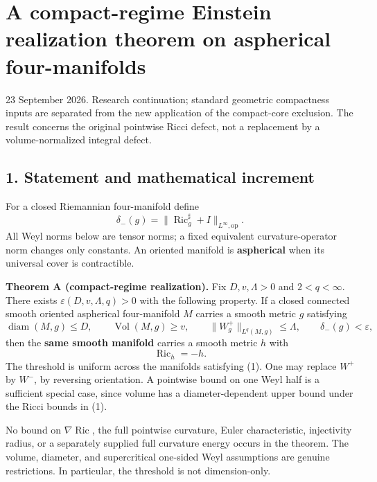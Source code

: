 \documentclass[
  11pt,
]{article}
\author{}
\date{23 September 2026}
\begin{document}
\hypertarget{a-compact-regime-einstein-realization-theorem-on-aspherical-four-manifolds}{%
\section{A compact-regime Einstein realization theorem on aspherical
four-manifolds}\label{a-compact-regime-einstein-realization-theorem-on-aspherical-four-manifolds}}

23 September 2026. Research continuation; standard geometric compactness
inputs are separated from the new application of the compact-core
exclusion. The result concerns the original pointwise Ricci defect, not
a replacement by a volume-normalized integral defect.

\hypertarget{statement-and-mathematical-increment}{%
\subsection{1. Statement and mathematical
increment}\label{statement-and-mathematical-increment}}

For a closed Riemannian four-manifold define \[
 \delta_-(g)=\|\operatorname{Ric}_g^{\sharp}+I\|_{L^\infty,\mathrm{op}}.
\] All Weyl norms below are tensor norms; a fixed equivalent
curvature-operator norm changes only constants. An oriented manifold is
\textbf{aspherical} when its universal cover is contractible.

\textbf{Theorem A (compact-regime realization).} Fix \(D,v,\Lambda>0\)
and \(2<q<\infty\). There exists \(\varepsilon(D,v,\Lambda,q)>0\) with
the following property. If a closed connected smooth oriented aspherical
four-manifold \(M\) carries a smooth metric \(g\) satisfying \[
 \operatorname{diam}(M,g)\le D,\qquad
 \operatorname{Vol}(M,g)\ge v,\qquad
 \|W_g^+\|_{L^q(M,g)}\le\Lambda,\qquad
 \delta_-(g)<\varepsilon,
                                                        \tag{1}
\] then the \textbf{same smooth manifold} carries a smooth metric \(h\)
with \[
                         \operatorname{Ric}_h=-h.        \tag{2}
\] The threshold is uniform across the manifolds satisfying (1). One may
replace \(W^+\) by \(W^-\), by reversing orientation. A pointwise bound
on one Weyl half is a sufficient special case, since volume has a
diameter-dependent upper bound under the Ricci bounds in (1).

No bound on \(\nabla\operatorname{Ric}\), the full pointwise curvature,
Euler characteristic, injectivity radius, or a separately supplied full
curvature energy occurs in the theorem. The volume, diameter, and
supercritical one-sided Weyl assumptions are genuine restrictions. In
particular, the threshold is not dimension-only.
\end{document}
